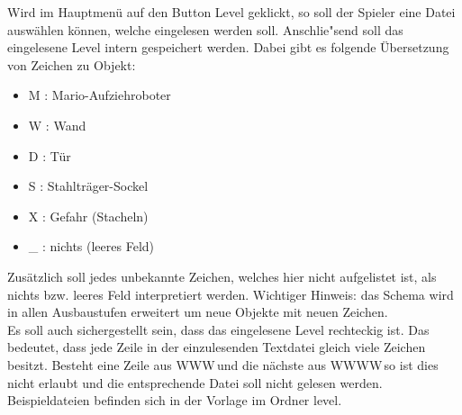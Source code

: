 Wird im Hauptmen\"u auf den Button \glqq Level\grqq{} geklickt, so soll der Spieler eine Datei auswählen k\"onnen, welche eingelesen werden soll.
Anschlie"send soll das eingelesene Level intern gespeichert werden.
Dabei gibt es folgende \"Ubersetzung von Zeichen zu Objekt:

\begin{itemize}
\item M : Mario-Aufziehroboter
\item W : Wand
\item D : T\"ur
\item S : Stahltr\"ager-Sockel
\item X : Gefahr (Stacheln)
\item \_ : nichts (leeres Feld)
\end{itemize}

Zus\"atzlich soll jedes unbekannte Zeichen, welches hier nicht aufgelistet ist, als nichts bzw. leeres Feld interpretiert werden. 
Wichtiger Hinweis: das Schema wird in allen Ausbaustufen erweitert um neue Objekte mit neuen Zeichen.\\
Es soll auch sichergestellt sein, dass das eingelesene Level rechteckig ist. Das bedeutet, dass jede Zeile in der einzulesenden Textdatei gleich viele Zeichen besitzt.
Besteht eine Zeile aus \dq WWW\dq \,und die n\"achste aus \dq WWWW\dq \,so ist dies nicht erlaubt und die entsprechende Datei soll nicht gelesen werden.
Beispieldateien befinden sich in der Vorlage im Ordner \glqq level\grqq{}.\\
